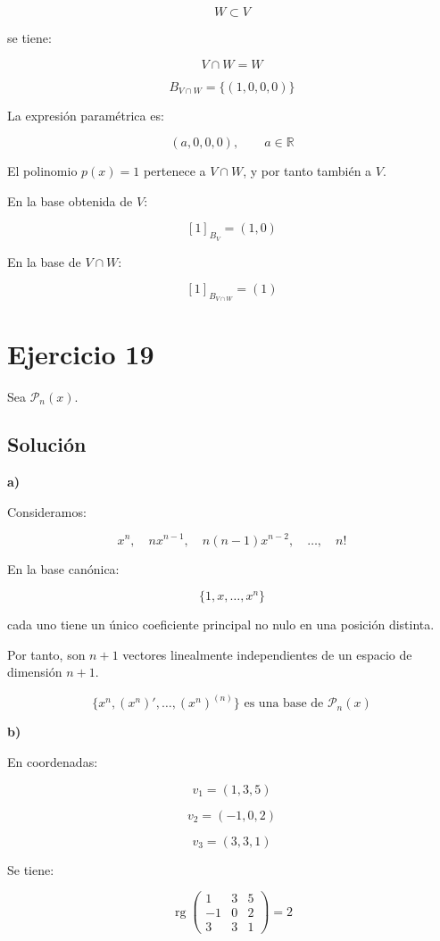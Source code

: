 \documentclass[11pt,a4paper]{article}
\newcommand{\R}{\mathbb{R}}
\newcommand{\Pn}{\mathcal{P}}
\newcommand{\rg}{\operatorname{rg}}
\begin{document}
	\[
	W\subset V
	\]

	se tiene:

	\[
	V\cap W=W
	\]

	\[
	\boxed{
	B_{V\cap W}
	=
	\{(1,0,0,0)\}
	}
	\]

	La expresión paramétrica es:

	\[
	\boxed{
	(a,0,0,0),
	\qquad
	a\in\R
	}
	\]

	El polinomio $p(x)=1$ pertenece a $V\cap W$, y por tanto también a $V$.

	En la base obtenida de $V$:

	\[
	\boxed{
	[1]_{B_V}=(1,0)
	}
	\]

	En la base de $V\cap W$:

	\[
	\boxed{
	[1]_{B_{V\cap W}}=(1)
	}
	\]

\section{Ejercicio 19}
	Sea $\Pn_n(x)$.

	\subsection{Solución}

	\textbf{a)}

	Consideramos:

	\[
	x^n,
	\quad
	nx^{n-1},
	\quad
	n(n-1)x^{n-2},
	\quad\ldots,\quad
	n!
	\]

	En la base canónica:

	\[
	\{1,x,\ldots,x^n\}
	\]

	cada uno tiene un único coeficiente principal no nulo en una posición distinta.

	Por tanto, son $n+1$ vectores linealmente independientes de un espacio de dimensión $n+1$.

	\[
	\boxed{
	\{x^n,(x^n)',\ldots,(x^n)^{(n)}\}
	\text{ es una base de }\Pn_n(x)
	}
	\]

	\textbf{b)}

	En coordenadas:

	\[
	v_1=(1,3,5)
	\]

	\[
	v_2=(-1,0,2)
	\]

	\[
	v_3=(3,3,1)
	\]

	Se tiene:

	\[
	\rg
	\begin{pmatrix}
	1&3&5\\
	-1&0&2\\
	3&3&1
	\end{pmatrix}
	=
	2
	\]
\end{document}
